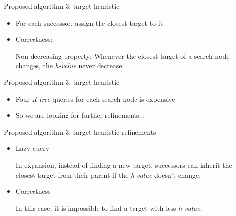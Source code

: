 \begin{frame}{Proposed algorithm 3: target heuristic}
\begin{minipage}{.9\textwidth}
\begin{itemize}
     \item \small{
        For each successor, assign the closest target to it
    }
     \item \small {
    Correctness:
    \begin{lemma}{Non-decreasing property:}
        Whenever the closest target of a search node changes,
        the \textit{h-value} never decrease.
    \end{lemma}
    }
\end{itemize}
\end{minipage}%
\end{frame}

\begin{frame}{Proposed algorithm 3: target heuristic}
\begin{minipage}{.9\textwidth}
\begin{itemize}
    \item \small{Four \textit{R-tree} queries for each search  node is expensive}
    \item \small{So we are looking for further refinements...}
\end{itemize}
\end{minipage}%
\end{frame}

\begin{frame}{Proposed algorithm 3: target heuristic refinements}
\begin{minipage}{.9\textwidth}
\begin{itemize}
    \item \small{Lazy query}
    \begin{Definition}
        In expansion, instead of finding a new target, successors can inherit the closest target from their parent if the \textit{h-value} doesn't change.
    \end{Definition}
    \item \small{Correctness}
    \begin{lemma}
        In this case, it is impossible to find a target with less \textit{h-value}.
    \end{lemma}
\end{itemize}
\end{minipage}%
\end{frame}

